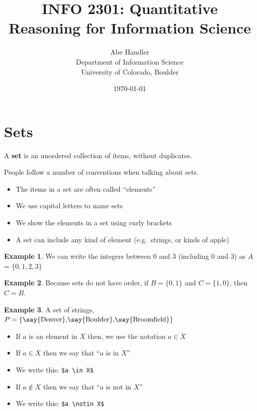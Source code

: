 \documentclass[]{article}
\theoremstyle{definition}
\newtheorem{exmp}{Example}[section]
\begin{document}
\title{INFO 2301: Quantitative Reasoning for Information Science}
\author{Abe Handler \\ Department of Information Science \\ University of Colorado, Boulder}
\date{\today}

\maketitle


\section{Sets}

A \textbf{set} is an unordered collection of items, without duplicates. 

People follow a number of conventions when talking about sets.

\begin{itemize}
    \item The items in a set are often called ``elements''
    \item We use capital letters to name sets
    \item We show the elements in a set using curly brackets
    \item A set can include any kind of element (e.g.\ strings, or kinds of apple)
\end{itemize}

\begin{exmp}
We can write the integers between 0 and 3 (including 0 and 3) as $A$ = $\{0,1,2,3\}$
\end{exmp}

\begin{exmp}
Because sets do not have order, if $ B= \{0,1\}$ and $C=\{1,0\}$, then $C=B$.
\end{exmp}

\begin{exmp}
A set of strings, $ P= \{ \text{\say{Denver},\say{Boulder},\say{Broomfield}} \}$
\end{exmp}

\begin{itemize}
    \item If $a$ is an element in $X$ then, we use the notation $a \in X$ 
    \item If $a \in X$ then we say that ``$a$ is in $X$''
    \item We write this: \verb|$a \in X$|
    \item If $a \notin X$ then we say that ``$a$ is not in $X$''
    \item We write this: \verb|$a \notin X$|
\end{itemize}
\end{document}
